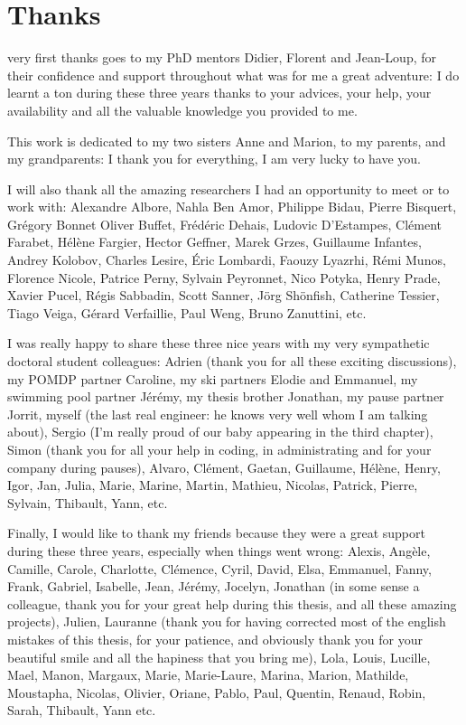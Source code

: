 \chapter*{Thanks}

 very first thanks goes to my PhD mentors Didier, Florent and Jean-Loup,
for their confidence and support throughout what was for me a great adventure:
I do learnt a ton during these three years thanks to your advices, your help, 
your availability and all the valuable knowledge you provided to me.

This work is dedicated to my two sisters Anne and Marion, to my parents, and my grandparents: 
I thank you for everything, I am very lucky to have you.

I will also thank all the amazing researchers 
I had an opportunity to meet or to work with:
Alexandre Albore,
Nahla Ben Amor,
Philippe Bidau, 
Pierre Bisquert,
Gr\'egory Bonnet
Oliver Buffet,
Fr\'ed\'eric Dehais,
Ludovic D'Estampes,
Cl\'ement Farabet,
H\'el\`ene Fargier, 
Hector Geffner,
Marek Grzes, 
Guillaume Infantes,
Andrey Kolobov,
Charles Lesire,
\'Eric Lombardi,
Faouzy Lyazrhi,
R\'emi Munos,
Florence Nicole,
Patrice Perny,
Sylvain Peyronnet,
Nico Potyka,
Henry Prade,
Xavier Pucel,
R\'egis Sabbadin, 
Scott Sanner,
J\"org Sh\"onfish,
Catherine Tessier,
Tiago Veiga,
G\'erard Verfaillie,
Paul Weng,
Bruno Zanuttini, etc.

I was really happy to share these three nice years with
my very sympathetic doctoral student colleagues: 
Adrien (thank you for all these exciting discussions), 
my POMDP partner Caroline,
my ski partners Elodie and Emmanuel,
my swimming pool partner J\'er\'emy, 
my thesis brother Jonathan, 
my pause partner Jorrit, 
myself (the last real engineer: he knows very well whom I am talking about), 
Sergio (I'm really proud of our baby appearing in the third chapter),  
Simon (thank you for all your help in coding, in administrating and for your company during pauses), 
Alvaro, Cl\'ement, Gaetan, Guillaume, H\'el\`ene, Henry, Igor, Jan, Julia, Marie, Marine, Martin, Mathieu, Nicolas, Patrick, Pierre, Sylvain, Thibault, Yann, etc.

Finally, I would like to thank my friends because they were a great support during these three years,
especially when things went wrong: 
Alexis, Ang\`ele, Camille, Carole, Charlotte, Cl\'emence, Cyril, David, Elsa, Emmanuel, Fanny,
Frank, Gabriel, Isabelle, Jean, J\'er\'emy, Jocelyn, Jonathan (in some sense a colleague, thank you for your great help during this thesis, and all these amazing projects), 
Julien, 
Lauranne (thank you for having corrected most of the english mistakes of this thesis, for your patience, and obviously thank you for your beautiful smile
and all the hapiness that you bring me), 
Lola, Louis, Lucille, Mael, Manon, Margaux, Marie, Marie-Laure, Marina, Marion, Mathilde, Moustapha, Nicolas, Olivier, Oriane, 
Pablo, Paul, Quentin, Renaud, Robin, Sarah, Thibault, Yann etc.

